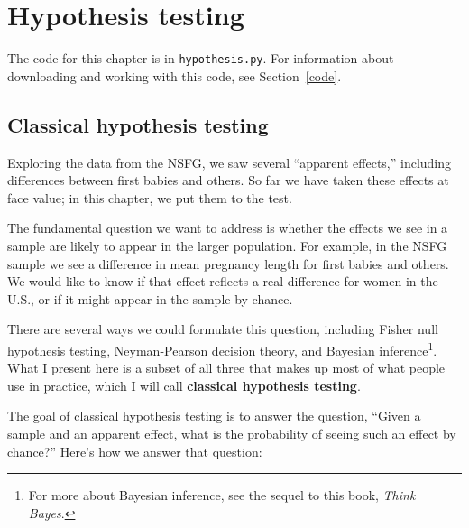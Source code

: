 \documentclass[12pt]{book}
\begin{document}
\chapter{Hypothesis testing}
\label{testing}

The code for this chapter is in \verb"hypothesis.py".  For information
about downloading and working with this code, see Section~\ref{code}.

\section{Classical hypothesis testing}

Exploring the data from the NSFG, we saw several ``apparent effects,''
including differences between first babies and others.
So far we have taken these effects at face value; in this chapter,
we put them to the test.

The fundamental question we want to address is whether the effects
we see in a sample are likely to appear in the larger population.
For example, in the NSFG sample we see a difference in mean pregnancy
length for first babies and others.  We would like to know if
that effect reflects a real difference for women
in the U.S., or if it might appear in the sample by chance.
 

There are several ways we could formulate this question, including
Fisher null hypothesis testing, Neyman-Pearson decision theory, and
Bayesian inference\footnote{For more about Bayesian inference, see the
  sequel to this book, {\it Think Bayes}.}.  What I present here is a
subset of all three that makes up most of what people use in practice,
which I will call {\bf classical hypothesis testing}.

The goal of classical hypothesis testing is to answer the question,
``Given a sample and an apparent effect, what is the probability of
seeing such an effect by chance?''  Here's how we answer that question:
\end{document}
